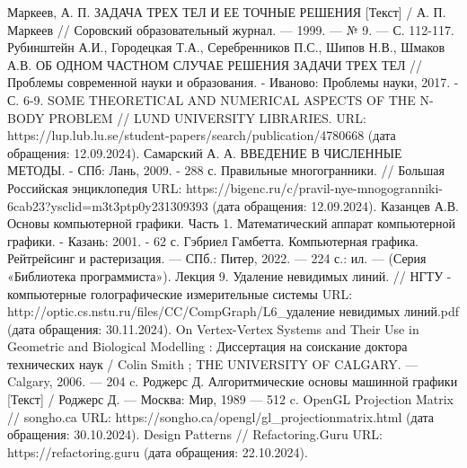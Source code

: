 \begin{thebibliography}{}
	 Маркеев, А. П. ЗАДАЧА ТРЕХ ТЕЛ И ЕЕ ТОЧНЫЕ РЕШЕНИЯ [Текст] / А. П. Маркеев // Соровский образовательный журнал. — 1999. — № 9. — С. 112-117.
	 Рубинштейн А.И., Городецкая Т.А., Серебренников П.С., Шипов Н.В., Шмаков А.В. ОБ ОДНОМ ЧАСТНОМ СЛУЧАЕ РЕШЕНИЯ ЗАДАЧИ ТРЕХ ТЕЛ // Проблемы современной науки и образования. - Иваново: Проблемы науки, 2017. - С. 6-9.
	 SOME THEORETICAL AND NUMERICAL ASPECTS OF THE N-BODY PROBLEM // LUND UNIVERSITY LIBRARIES. URL: https://lup.lub.lu.se/student-papers/search/publication/4780668 (дата обращения: 12.09.2024).
	 Самарский А. А. ВВЕДЕНИЕ В ЧИСЛЕННЫЕ МЕТОДЫ. - СПб: Лань, 2009. - 288 с.
	 Правильные многогранники. // Большая Российская энциклопедия URL: https://bigenc.ru/c/pravil-nye-mnogogranniki-6cab23?ysclid=m3t3ptp0y231309393 (дата обращения: 12.09.2024).
	 Казанцев А.В. Основы компьютерной графики. Часть 1. Математический аппарат компьютерной графики. - Казань: 2001. - 62 с.
	 Гэбриел Гамбетта. Компьютерная графика. Рейтрейсинг и растеризация. — СПб.: Питер, 2022. — 224 с.: ил. — (Серия «Библиотека программиста»).
	 Лекция 9. Удаление невидимых линий. // НГТУ - компьютерные голографические измерительные системы URL: http://optic.cs.nstu.ru/files/CC/CompGraph/L6\_удаление невидимых линий.pdf (дата обращения: 30.11.2024).
	 On Vertex-Vertex Systems and Their Use in Geometric and Biological Modelling : Диссертация на соискание доктора технических наук / Colin Smith ; THE UNIVERSITY OF CALGARY. — Calgary, 2006. — 204 c.
	 Роджерс Д. Алгоритмические основы машинной графики [Текст] / Роджерс Д. — Москва: Мир, 1989 — 512 c.
	 OpenGL Projection Matrix // songho.ca URL: https://songho.ca/opengl/gl\_projectionmatrix.html (дата обращения: 30.10.2024).
	 Design Patterns // Refactoring.Guru URL: https://refactoring.guru (дата обращения: 22.10.2024).
\end{thebibliography}
